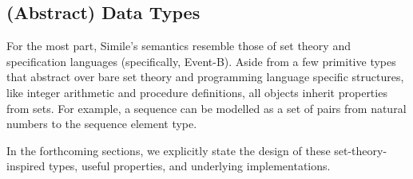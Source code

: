 
\subsection{(Abstract) Data Types}
For the most part, Simile's semantics resemble those of set theory and specification languages (specifically, Event-B). Aside from a few primitive types that abstract over bare set theory and programming language specific structures, like integer arithmetic and procedure definitions, all objects inherit properties from sets. For example, a sequence can be modelled as a set of pairs from natural numbers to the sequence element type.

In the forthcoming sections, we explicitly state the design of these set-theory-inspired types, useful properties, and underlying implementations.

